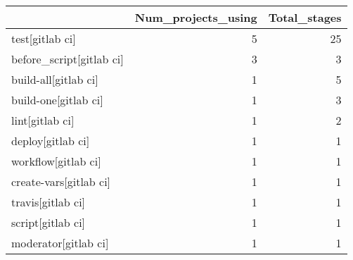 \begin{tabular}{lrr}
\toprule
{} &  Num\_projects\_using &  Total\_stages \\
\midrule
test[gitlab ci]          &                   5 &            25 \\
before\_script[gitlab ci] &                   3 &             3 \\
build-all[gitlab ci]     &                   1 &             5 \\
build-one[gitlab ci]     &                   1 &             3 \\
lint[gitlab ci]          &                   1 &             2 \\
deploy[gitlab ci]        &                   1 &             1 \\
workflow[gitlab ci]      &                   1 &             1 \\
create-vars[gitlab ci]   &                   1 &             1 \\
travis[gitlab ci]        &                   1 &             1 \\
script[gitlab ci]        &                   1 &             1 \\
moderator[gitlab ci]     &                   1 &             1 \\
\bottomrule
\end{tabular}
